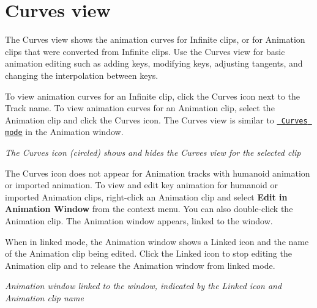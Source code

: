 \chapter{Curves view}
\hypertarget{md__hey_tea_9_2_library_2_package_cache_2com_8unity_8timeline_0d1_87_85_2_documentation_0i_2crv__about}{}\label{md__hey_tea_9_2_library_2_package_cache_2com_8unity_8timeline_0d1_87_85_2_documentation_0i_2crv__about}
\label{md__hey_tea_9_2_library_2_package_cache_2com_8unity_8timeline_0d1_87_85_2_documentation_0i_2crv__about_autotoc_md4634}%
%
 The Curves view shows the animation curves for Infinite clips, or for Animation clips that were converted from Infinite clips. Use the Curves view for basic animation editing such as adding keys, modifying keys, adjusting tangents, and changing the interpolation between keys.

To view animation curves for an Infinite clip, click the Curves icon next to the Track name. To view animation curves for an Animation clip, select the Animation clip and click the Curves icon. The Curves view is similar to \href{https://docs.unity3d.com/Manual/animeditor-AnimationCurves.html}{\texttt{ Curves mode}} in the Animation window.



{\itshape The Curves icon (circled) shows and hides the Curves view for the selected clip}

The Curves icon does not appear for Animation tracks with humanoid animation or imported animation. To view and edit key animation for humanoid or imported Animation clips, right-\/click an Animation clip and select {\bfseries{Edit in Animation Window}} from the context menu. You can also double-\/click the Animation clip. The Animation window appears, linked to the  window.

When in linked mode, the Animation window shows a Linked icon and the name of the Animation clip being edited. Click the Linked icon to stop editing the Animation clip and to release the Animation window from linked mode.



{\itshape Animation window linked to the  window, indicated by the Linked icon and Animation clip name} 
